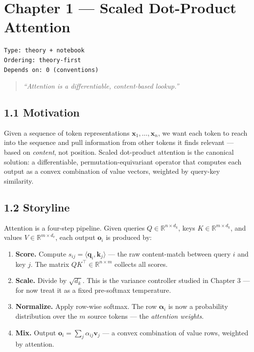 \documentclass[
]{article}
\author{}
\date{}
\providecommand{\tightlist}{%
  \setlength{\itemsep}{0pt}\setlength{\parskip}{0pt}}
\begin{document}
\hypertarget{chapter-1-scaled-dot-product-attention}{%
\section{Chapter 1 --- Scaled Dot-Product
Attention}\label{chapter-1-scaled-dot-product-attention}}

\begin{verbatim}
Type: theory + notebook
Ordering: theory-first
Depends on: 0 (conventions)
\end{verbatim}

\begin{quote}
\emph{``Attention is a differentiable, content-based lookup.''}
\end{quote}

\hypertarget{motivation}{%
\subsection{1.1 Motivation}\label{motivation}}

Given a sequence of token representations
\(\mathbf{x}_1, \dots, \mathbf{x}_n\), we want each token to reach into
the sequence and pull information from other tokens it finds relevant
--- based on \emph{content}, not position. Scaled dot-product attention
is the canonical solution: a differentiable, permutation-equivariant
operator that computes each output as a convex combination of value
vectors, weighted by query-key similarity.

\hypertarget{storyline}{%
\subsection{1.2 Storyline}\label{storyline}}

Attention is a four-step pipeline. Given queries
\(Q \in \mathbb{R}^{n \times d_k}\), keys
\(K \in \mathbb{R}^{m \times d_k}\), and values
\(V \in \mathbb{R}^{m \times d_v}\), each output \(\mathbf{o}_i\) is
produced by:

\begin{enumerate}
\def\labelenumi{\arabic{enumi}.}
\tightlist
\item
  \textbf{Score.} Compute
  \(s_{ij} = \langle \mathbf{q}_i, \mathbf{k}_j \rangle\) --- the raw
  content-match between query \(i\) and key \(j\). The matrix
  \(QK^\top \in \mathbb{R}^{n \times m}\) collects all scores.
\item
  \textbf{Scale.} Divide by \(\sqrt{d_k}\). This is the variance
  controller studied in Chapter 3 --- for now treat it as a fixed
  pre-softmax temperature.
\item
  \textbf{Normalize.} Apply row-wise softmax. The row
  \(\boldsymbol{\alpha}_i\) is now a probability distribution over the
  \(m\) source tokens --- the \emph{attention weights}.
\item
  \textbf{Mix.} Output
  \(\mathbf{o}_i = \sum_j \alpha_{ij} \mathbf{v}_j\) --- a convex
  combination of value rows, weighted by attention.
\end{enumerate}
\end{document}
